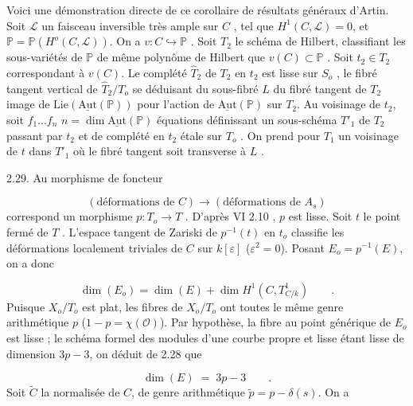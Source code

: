 Voici une démonstration directe de ce corollaire de résultats généraux d'Artin. Soit $\mathcal{L}$ un faisceau inversible très ample sur $C$ , tel que $H^1(C,\mathcal{L}) = 0$, et $\mathbb{P} = \mathbb{P}(H^o(C,\mathcal{L}))$. On a $v : C \hookrightarrow \mathbb{P}$ . Soit $T_2$ le schéma de Hilbert, classifiant les sous-variétés de $\mathbb{P}$ de même polynôme de Hilbert que $v(C) \subset \mathbb{P}$ . Soit $t_2 \in T_2$ correspondant à $v(C)$. Le complété $\hat{T}_2$ de $T_2$ en $t_2$ est lisse sur $S_o$ , le fibré tangent vertical de $\hat{T}_2/T_o$ se déduisant du sous-fibré $L$ du fibré tangent de $T_2$ image de $\mathrm{Lie}(\underline{\mathrm{Aut}}(\mathbb{P}))$ pour l'action de $\underline{\mathrm{Aut}}(\mathbb{P})$ sur $T_2$. Au voisinage de $t_2$, soit $f_1 \ldots f_n$ $n = \dim \underline{\mathrm{Aut}}(\mathbb{P})$ équations définissant un sous-schéma $T'_1$ de $T_2$ passant par $t_2$ et de complété en $t_2$ étale sur $T_o$ . On prend pour $T_1$ un voisinage de $t$ dans $T'_1$ où le fibré tangent soit transverse à $L$ .



2.29. Au morphisme de foncteur

\begin{equation*}
(\text{déformations de } C) \longrightarrow (\text{déformations de } A_s)
\end{equation*}
correspond un morphisme $p : T_o \longrightarrow T$ . D'après VI 2.10 \qquad , $p$ est lisse. Soit $t$ le point fermé de $T$ . L'espace tangent de Zariski de $p^{-1}(t)$ en $t_o$ classifie les déformations localement triviales de $C$ sur $k[\varepsilon]$ ($\varepsilon^2 = 0$). Posant $E_o = p^{-1}(E)$, on a donc

\begin{equation}\tag{2.29.1}
\dim(E_o) = \dim(E) + \dim H^1(C, T^1_{C/k}) \qquad .
\end{equation}
Puisque $X_o/T_o$ est plat, les fibres de $X_o/T_o$ ont toutes le même genre arithmétique $p$ ($1-p = \chi(\mathcal{O})$). Par hypothèse, la fibre au point générique de $E_o$ est lisse ; le schéma formel des modules d'une courbe propre et lisse étant lisse de dimension $3p-3$, on déduit de 2.28 que

\begin{equation}\tag{2.29.2}
\dim(E) \;=\; 3p-3 \qquad .
\end{equation}
Soit $\widetilde{C}$ la normalisée de $C$, de genre arithmétique $\widetilde{p} = p - \delta(s)$. On a

